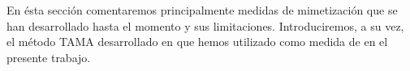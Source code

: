 En ésta sección comentaremos principalmente medidas de mimetización que se han desarrollado hasta el momento y sus limitaciones. Introduciremos, a su vez, el método TAMA desarrollado en \cite{KOU2008} que hemos utilizado como medida de \entrainment en el presente trabajo.




